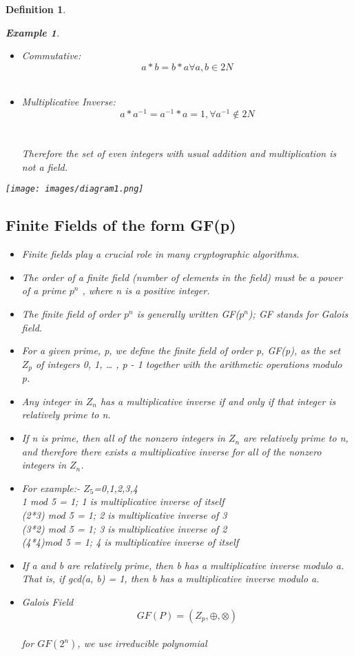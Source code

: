 \documentclass{article}
\newtheorem{defn}{Definition} [section]
\newtheorem{ex}{Example}[section]
\begin{document}
\begin{defn}
\begin{ex}
\begin{enumerate}
\begin{itemize}
	        $a*(b+c)=(a*b)+ (a*c)$  $ \forall a,b,c \in 2N $ \\
	        $(a+b)*c=(a*c)+(b*c)$   $ \forall a,b,c \in 2N $ \\
	    \item Commutative: $$a*b=b*a  \forall a,b \in 2N$$ \\
	    \item Multiplicative Inverse: $$a*a^{-1} = a^{-1} * a = 1 , \forall a^{-1} \notin 2N$$\\
	    \\Therefore the set of even integers with usual addition and multiplication is not a field.
    \end{itemize}	
\end{enumerate}
\end{ex}
\texttt{[image: images/diagram1.png]}
\subsection{Finite Fields of the form GF(p)}
\begin{itemize}
    \item Finite fields play a crucial role in many cryptographic algorithms.
    \item The order of a finite field (number of elements in the field) must be a power of a prime $p^{n} $ , where n is a positive integer.
    \item The finite field of order $p^{n} $ is generally written GF($p^{n} $); GF stands for Galois field.
    \item For a given prime, p, we define the finite field of order p, GF(p), as the set $Z_p$ of integers {0, 1, … , p - 1} together with the arithmetic operations modulo p. 
    \item Any integer in $Z_n$ has a multiplicative inverse if and only if that integer is relatively prime to n.
    \item If n is prime, then all of the nonzero integers in $Z_n$ are relatively prime to n, and therefore there exists a multiplicative inverse for all of the nonzero integers in $Z_n$.
    \item For example:- $Z_5$={0,1,2,3,4}
    \\1 mod 5 = 1; 1 is multiplicative inverse of itself
    \\(2*3) mod 5 = 1; 2 is multiplicative inverse of 3
    \\(3*2) mod 5 = 1; 3 is multiplicative inverse of 2
    \\(4*4)mod 5 = 1; 4 is multiplicative inverse of itself
    \\
    \item If a and b are relatively prime, then b has a multiplicative inverse modulo a. That is, if gcd(a, b) = 1, then b has a multiplicative inverse modulo a.
    \item Galois Field
    $$GF(P)=(Z_p,\oplus,\otimes)$$
    \\for $GF(2^{n})$, we use irreducible polynomial
\end{itemize}
\end{defn}
\end{document}
